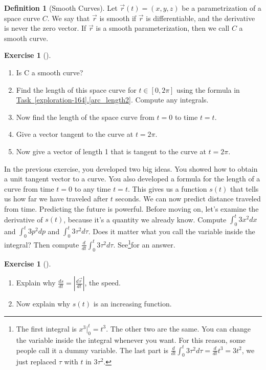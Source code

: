 \documentclass[10pt,]{book}
\theoremstyle{plain}
\theoremstyle{definition}
\newtheorem{definition}[theorem]{Definition}
\theoremstyle{definition}
\theoremstyle{definition}
\theoremstyle{definition}
\newtheorem{exploration}[project]{Exercise}
\theoremstyle{definition}
\numberwithin{equation}{section}
\newcommand{\ds}{\displaystyle}
\begin{document}
\begin{definition}[{Smooth Curves}]\label{def_smooth_curve}
Let \(\vec r(t)=(x,y,z)\) be a parametrization of a space curve \(C\). We say that \(\vec r\) is smooth if \(\vec r\) is differentiable, and the derivative is never the zero vector. If \(\vec r\) is a smooth parameterization, then we call \(C\) a smooth curve.%
\end{definition}
\begin{exploration}[]\label{prob_basic_helix}
\leavevmode%
\begin{enumerate}[font=\bfseries,label=(\alph*),ref=\alph*]
\item\label{task-386} Is C a smooth curve?%
\item\label{task-387} Find the length of this space curve for \(t\in[0,2\pi]\) using the formula in \hyperref[arc_length2]{Task~\ref{exploration-164}.\ref{arc_length2}}. Compute any integrals.%
\item\label{task-388} Now find the length of the space curve from \(t=0\) to time \(t=t\).%
\item\label{task-389} Give a vector tangent to the curve at \(t=2\pi\).%
\item\label{task-390} Now give a vector of length 1 that is tangent to the curve at \(t=2\pi\).%
\end{enumerate}
\end{exploration}
In the previous exercise, you developed two big ideas. You showed how to obtain a unit tangent vector to a curve. You also developed a formula for the length of a curve from time \(t=0\) to any time \(t=t\). This gives us a function \(s(t)\) that tells us how far we have traveled after \(t\) seconds. We can now predict distance traveled from time. Predicting the future is powerful. Before moving on, let's examine the derivative of \(s(t)\), because it's a quantity we already know.%
Compute \(\ds \int_0^t 3x^2 dx\) and \(\ds \int_0^t 3p^2 dp\) and \(\ds \int_0^t 3\tau^2 d\tau\). Does it matter what you call the variable inside the integral? Then compute \(\ds\frac{d}{dt} \int_0^t 3\tau^2 d\tau\). See\footnote{The first integral is \(x^3|_0^t = t^3\). The other two are the same. You can change the variable inside the integral whenever you want.  For this reason, some people call it a dummy variable. The last part is \(\ds\frac{d}{dt} \int_0^t 3\tau^2 d\tau = \frac{d}{dt} t^3 = 3t^2\), we just replaced \(\tau\) with \(t\) in \(3\tau^2\).\label{fn-9}}for an answer.%
\begin{exploration}[]\label{fundamental_theorem_of_calculus_as_it_applies_to_arc_length_parameter}
\leavevmode%
\begin{enumerate}[font=\bfseries,label=(\alph*),ref=\alph*]
\item\label{task-391} Explain why \(\ds\frac{ds}{dt} = \left|\frac {d\vec r}{dt} \right|\), the speed.%
\item\label{task-392} Now explain why \(s(t)\) is an increasing function.%
\end{enumerate}
\end{exploration}
\end{document}
